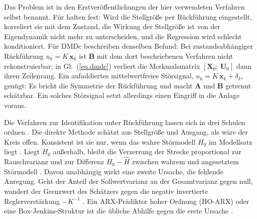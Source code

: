 Das Problem ist in den Erstveröffentlichungen der hier verwendeten
Verfahren selbst benannt.
Für \sindyc{} halten
\cite[S.~713]{bruntonSparseIdentificationNonlinear2016} fest: Wird die
Stellgröße per Rückführung eingestellt, korreliert sie mit dem Zustand,
die Wirkung der Stellgröße ist von der Eigendynamik nicht mehr zu
unterscheiden, und die Regression wird schlecht konditioniert. Für DMDc
beschreiben \cite[S.~153]{proctorDynamicModeDecomposition2016} denselben
Befund: Bei zustandsabhängiger Rückführung $u_k = K\,\mathbf x_k$ ist
$\mathbf B$ mit dem dort beschriebenen Verfahren nicht rekonstruierbar;
in Gl.~(\ref{eq.dmdc}) verliert die Merkmalsmatrix
$[\mathbf X_0;\,\mathbf U_0]$ dann ihren Zeilenrang. Ein aufaddiertes
mittelwertfreies Störsignal, $u_k = K\,\mathbf x_k + \delta_k$, genügt:
Es bricht die Symmetrie der Rückführung und macht $\mathbf A$ und
$\mathbf B$ getrennt schätzbar. Ein solches Störsignal setzt allerdings
einen Eingriff in die Anlage voraus.


Die Verfahren zur Identifikation unter Rückführung lassen sich in drei
Schulen ordnen \cite{forssellClosedloopIdenticationRevisited1999}. Die
direkte Methode schätzt aus Stellgröße und Ausgang, als wäre der Kreis
offen. Konsistent ist sie nur, wenn das wahre Störmodell $H_0$ im
Modellsatz liegt \cite{gustavssonIdentificationProcessesClosed1977}.
Liegt $H_0$ außerhalb, bleibt die Verzerrung der Strecke proportional zur
Rauschvarianz und zur Differenz $H_0-\hat H$ zwischen wahrem und
angesetztem Störmodell
\cite{karimiComparisonClosedloopIdentification1998}. Davon unabhängig
wirkt eine zweite Ursache, die fehlende Anregung.
Geht der Anteil der Sollwertvarianz an der Gesamtvarianz gegen null,
wandert der Grenzwert des Schätzers gegen die negativ invertierte
Reglerverstärkung $-K^{-1}$
\cite{lovlandClosedloopIdentificationChallenge2025}.
Ein ARX-Prädiktor
hoher Ordnung (HO-ARX) oder eine Box-Jenkins-Struktur ist die übliche
Abhilfe gegen die erste Ursache \cite{ljungSystemIdentificationTheory1999}.

